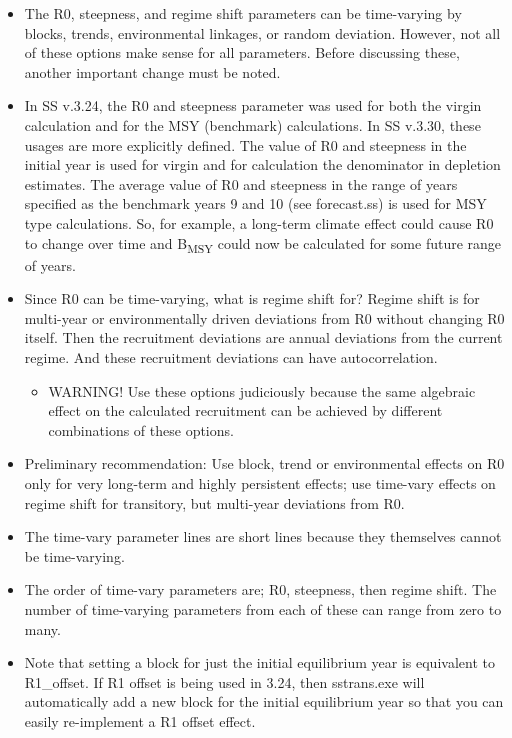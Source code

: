 \begin{itemize}
	\item 	The R0, steepness, and regime shift parameters can be time-varying by blocks, trends, environmental linkages, or random deviation.  However, not all of these options make sense for all parameters.  Before discussing these, another important change must be noted.
	\item In SS v.3.24, the R0 and steepness parameter was used for both the virgin calculation and for the MSY (benchmark) calculations.  In SS v.3.30, these usages are more explicitly defined.  The value of R0 and steepness in the initial year is used for virgin and for calculation the denominator in depletion estimates.  The average value of R0 and steepness in the range of years specified as the benchmark years 9 and 10 (see forecast.ss) is used for MSY type calculations.  So, for example, a long-term climate effect could cause R0 to change over time and B\textsubscript{MSY} could now be calculated for some future range of years.
	\item Since R0 can be time-varying, what is regime shift for?  Regime shift is for multi-year or environmentally driven deviations from R0 without changing R0 itself.  Then the recruitment deviations are annual deviations from the current regime.  And these recruitment deviations can have autocorrelation.
	
	\begin{itemize}
		\item WARNING!  Use these options judiciously because the same algebraic effect on the calculated recruitment can be achieved by different combinations of these options.
	\end{itemize}
	
	\item Preliminary recommendation:  Use block, trend or environmental effects on R0 only for very long-term and highly persistent effects; use time-vary effects on regime shift for transitory, but multi-year deviations from R0.
	
	\item The time-vary parameter lines are short lines because they themselves cannot be time-varying.
	
	\item The order of time-vary parameters are; R0,  steepness, then regime shift.  The number of time-varying parameters from each of these can range from zero to many. \item Note that setting a block for just the initial equilibrium year is equivalent to R1\_offset.  If R1 offset is being used in 3.24, then sstrans.exe will automatically add a new block for the initial equilibrium year so that you can easily re-implement a R1 offset effect.
\end{itemize}

